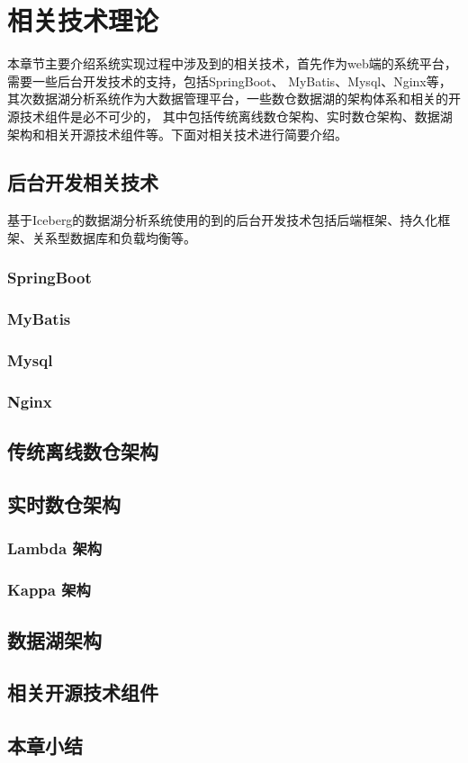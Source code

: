 
\chapter{相关技术理论}

本章节主要介绍系统实现过程中涉及到的相关技术，首先作为web端的系统平台，需要一些后台开发技术的支持，包括SpringBoot、
MyBatis、Mysql、Nginx等，其次数据湖分析系统作为大数据管理平台，一些数仓数据湖的架构体系和相关的开源技术组件是必不可少的，
其中包括传统离线数仓架构、实时数仓架构、数据湖架构和相关开源技术组件等。下面对相关技术进行简要介绍。

\section{后台开发相关技术}

基于Iceberg的数据湖分析系统使用的到的后台开发技术包括后端框架、持久化框架、关系型数据库和负载均衡等。

\subsection{SpringBoot}

\subsection{MyBatis}

\subsection{Mysql}

\subsection{Nginx}

\section{传统离线数仓架构}

\section{实时数仓架构}

\subsection{Lambda 架构}

\subsection{Kappa 架构}

\section{数据湖架构}

\section{相关开源技术组件}

\section{本章小结}

